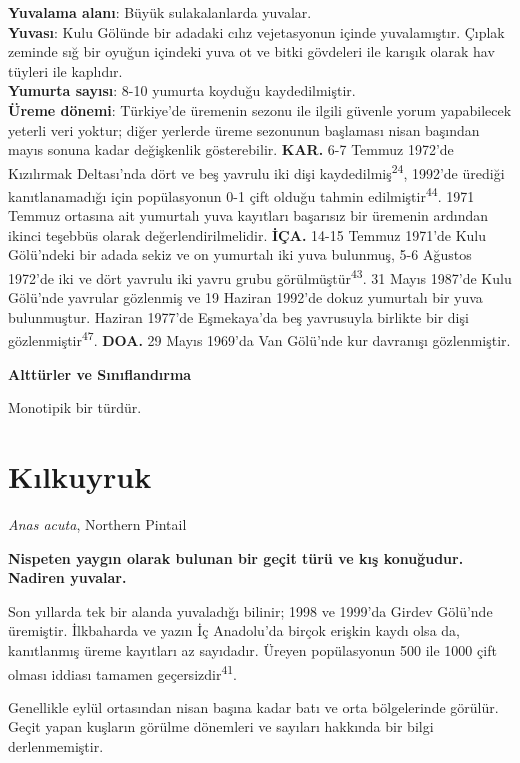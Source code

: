 \documentclass[
  letterpaper,
  DIV=11,
  numbers=noendperiod]{scrreprt}
\begin{document}
\textbf{Yuvalama alanı}: Büyük sulakalanlarda yuvalar.\\
\textbf{Yuvası}: Kulu Gölünde bir adadaki cılız vejetasyonun içinde
yuvalamıştır. Çıplak zeminde sığ bir oyuğun içindeki yuva ot ve bitki
gövdeleri ile karışık olarak hav tüyleri ile kaplıdır.\\
\textbf{Yumurta sayısı}: 8-10 yumurta koyduğu kaydedilmiştir.\\
\textbf{Üreme dönemi}: Türkiye'de üremenin sezonu ile ilgili güvenle
yorum yapabilecek yeterli veri yoktur; diğer yerlerde üreme sezonunun
başlaması nisan başından mayıs sonuna kadar değişkenlik gösterebilir.
\textbf{KAR.} 6-7 Temmuz 1972'de Kızılırmak Deltası'nda dört ve beş
yavrulu iki dişi kaydedilmiş\textsuperscript{24}, 1992'de ürediği
kanıtlanamadığı için popülasyonun 0-1 çift olduğu tahmin
edilmiştir\textsuperscript{44}. 1971 Temmuz ortasına ait yumurtalı yuva
kayıtları başarısız bir üremenin ardından ikinci teşebbüs olarak
değerlendirilmelidir. \textbf{İÇA.} 14-15 Temmuz 1971'de Kulu Gölü'ndeki
bir adada sekiz ve on yumurtalı iki yuva bulunmuş, 5-6 Ağustos 1972'de
iki ve dört yavrulu iki yavru grubu görülmüştür\textsuperscript{43}. 31
Mayıs 1987'de Kulu Gölü'nde yavrular gözlenmiş ve 19 Haziran 1992'de
dokuz yumurtalı bir yuva bulunmuştur. Haziran 1977'de Eşmekaya'da beş
yavrusuyla birlikte bir dişi gözlenmiştir\textsuperscript{47}.
\textbf{DOA.} 29 Mayıs 1969'da Van Gölü'nde kur davranışı gözlenmiştir.

\textbf{Alttürler ve Sınıflandırma}

Monotipik bir türdür.

\section{Kılkuyruk}\label{kux131lkuyruk}

\emph{Anas acuta}, Northern Pintail

\textbf{Nispeten yaygın olarak bulunan bir geçit türü ve kış konuğudur.
Nadiren yuvalar.}

Son yıllarda tek bir alanda yuvaladığı bilinir; 1998 ve 1999'da Girdev
Gölü'nde üremiştir. İlkbaharda ve yazın İç Anadolu'da birçok erişkin
kaydı olsa da, kanıtlanmış üreme kayıtları az sayıdadır. Üreyen
popülasyonun 500 ile 1000 çift olması iddiası tamamen
geçersizdir\textsuperscript{41}.

Genellikle eylül ortasından nisan başına kadar batı ve orta bölgelerinde
görülür. Geçit yapan kuşların görülme dönemleri ve sayıları hakkında bir
bilgi derlenmemiştir.
\end{document}

